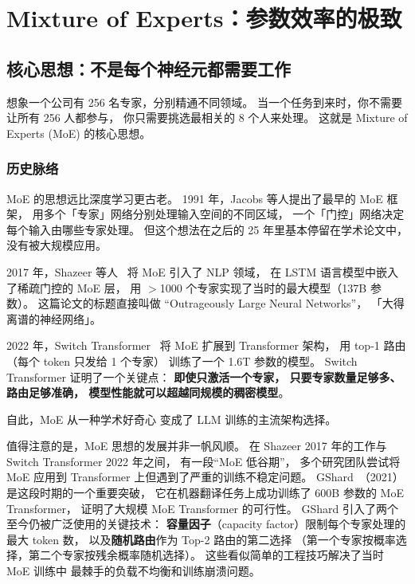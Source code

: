 \chapter{Mixture of Experts：参数效率的极致}
\label{ch:moe}

\section{核心思想：不是每个神经元都需要工作}

想象一个公司有 256 名专家，分别精通不同领域。
当一个任务到来时，你不需要让所有 256 人都参与，
你只需要挑选最相关的 8 个人来处理。
这就是 Mixture of Experts (MoE) 的核心思想。

\subsection{历史脉络}

MoE 的思想远比深度学习更古老。
1991 年，Jacobs 等人提出了最早的 MoE 框架，%
用多个「专家」网络分别处理输入空间的不同区域，
一个「门控」网络决定每个输入由哪些专家处理。
但这个想法在之后的 25 年里基本停留在学术论文中，
没有被大规模应用。

2017 年，Shazeer 等人~\cite{shazeer2017moe}
将 MoE 引入了 NLP 领域，
在 LSTM 语言模型中嵌入了稀疏门控的 MoE 层，
用 $>$1000 个专家实现了当时的最大模型（137B 参数）。
这篇论文的标题直接叫做
“Outrageously Large Neural Networks”，
「大得离谱的神经网络」。

2022 年，Switch Transformer~\cite{fedus2022switch}
将 MoE 扩展到 Transformer 架构，
用 top-1 路由（每个 token 只发给 1 个专家）
训练了一个 1.6T 参数的模型。
Switch Transformer 证明了一个关键点：
\textbf{即使只激活一个专家，
只要专家数量足够多、路由足够准确，
模型性能就可以超越同规模的稠密模型}。

自此，MoE 从一种学术好奇心
变成了 LLM 训练的主流架构选择。

值得注意的是，MoE 思想的发展并非一帆风顺。
在 Shazeer 2017 年的工作与 Switch Transformer 2022 年之间，
有一段“MoE 低谷期”，
多个研究团队尝试将 MoE 应用到 Transformer 上但遇到了严重的训练不稳定问题。
GShard~\cite{lepikhin2021gshard}（2021）是这段时期的一个重要突破，
它在机器翻译任务上成功训练了 600B 参数的 MoE Transformer，
证明了大规模 MoE Transformer 的可行性。
GShard 引入了两个至今仍被广泛使用的关键技术：
\textbf{容量因子}（capacity factor）限制每个专家处理的最大 token 数，
以及\textbf{随机路由}作为 Top-2 路由的第二选择
（第一个专家按概率选择，第二个专家按残余概率随机选择）。
这些看似简单的工程技巧解决了当时 MoE 训练中
最棘手的负载不均衡和训练崩溃问题。


